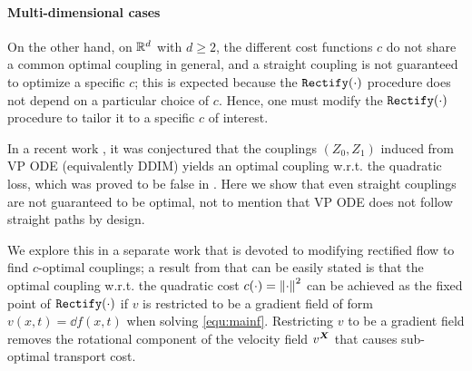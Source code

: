\paragraph{Multi-dimensional cases} 
On the other hand, 
on $\mathbb{R}^d$ with $d\geq 2$, 
the different cost functions $c$  do not share a common optimal coupling in general, 
and a straight coupling is not guaranteed to optimize 
a specific $c$; this is expected because the $\mathtt{Rectify}(\cdot)$ procedure does not depend on a particular choice of $c$.
Hence, one must modify the $\mathtt{Rectify}(\cdot)$ procedure 
to tailor it to a specific $c$ of interest. 


In a recent work 
\cite{khrulkov2022understanding}, 
it was  conjectured that the couplings $(Z_0,Z_1)$ induced from VP ODE (equivalently DDIM) yields an optimal coupling w.r.t. the quadratic loss, which was proved to be false in  \cite{lavenant2022flow, tanana2021comparison}. 
Here we show that 
even straight couplings 
are not guaranteed to be optimal, not to mention that VP ODE does not follow straight paths by design. 

We explore this in a separate work  \cite{rectifyOT} that is devoted to
modifying rectified flow to  find 
$c$-optimal couplings;
a result 
from \cite{rectifyOT} 
that can be easily stated 
is that 
the optimal coupling 
w.r.t. the quadratic cost $c(\cdot)=\left\lVert\cdot\right\rVert^2$ 
can be achieved as the fixed point of $\mathtt{Rectify}(\cdot)$ 
if $v$ is restricted to be a gradient field of form $v(x,t) = \dd f(x,t)$ 
when solving \eqref{equ:mainf}. Restricting $v$ to be a gradient field removes the rotational component of the velocity field $v^{{\boldsymbol{X}}}$ that causes sub-optimal transport cost.

 


